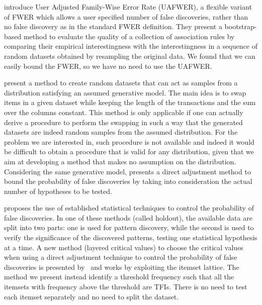 \citet{LallichTP06} introduce User Adjusted
Family-Wise Error Rate (UAFWER), a flexible variant of FWER which allows a user
specified number of false discoveries, rather than no false discovery as in the
standard FWER definition. They present a bootstrap-based method to evaluate the
quality of a collection of association rules by comparing their empirical
interestingness with the interestingness in a sequence of random datasets
obtained by resampling the original data. We found that we can easily bound the
FWER, so we have no need to use the UAFWER.
\fi

\citet{GionisMMT07} present a method to create random datasets that can act as
samples from a distribution satisfying an assumed generative model. The main
idea is to swap items in a given dataset while keeping the length of the
transactions and the sum over the columns constant. This method is only
applicable if one can actually derive a procedure to perform the swapping in
such a way that the generated datasets are indeed random samples from the assumed
distribution. For the problem we are interested in, such procedure is not
available and indeed it would be difficult to obtain a procedure that is
valid for any distribution, given that we aim at developing a method that makes
no assumption on the distribution. Considering the same generative model,
\citet{Hanhijarvi11} presents a direct adjustment method to bound the
probability of false discoveries by %
taking into consideration the actual number of hypotheses to be tested.

\citet{Webb07} proposes the use of established statistical techniques to
control the probability of false discoveries.
In one of these methods (called holdout), the available data are split into two parts: one is
used for pattern discovery, while the second is used to verify the significance
of the discovered patterns, testing one statistical hypothesis at a time. A new
method (layered critical values) to choose the critical values when using a
direct adjustment technique to control the probability of false discoveries %
is presented by~\citet{Webb08} and works by exploiting the itemset lattice.
The method we present instead identify a threshold frequency such that all the
itemsets with frequency above the threshold are TFIs. There is no need to test
each itemset separately and no need to split the dataset.

